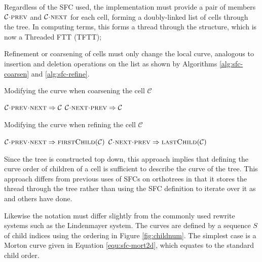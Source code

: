 \documentclass{IIBproject}
\newcommand{\acc}{{\mkern 0.5mu\cdot\mkern 0.5mu}}
\numberwithin{figure}{section}
\begin{document}
Regardless of the SFC used, the implementation must provide a pair of members $\mathcal{C}\acc\textproc{prev}$ and $\mathcal{C}\acc\textproc{next}$ for each cell, forming a doubly-linked list of cells through the tree. In computing terms, this forms a thread through the structure, which is now a Threaded FTT (TFTT);

Refinement or coarsening of cells must only change the local curve, analogous to insertion and deletion operations on the list as shown by Algorithms \ref{alg:sfc-coarsen} and \ref{alg:sfc-refine}.

\begin{algorithm}[H]
    \caption{Modifying the curve when coarsening the cell $\mathcal{C}$}
    \label{alg:sfc-coarsen}

    \begin{algorithmic}
        \State $\mathcal{C}\acc\textproc{prev}\acc\textproc{next} \Rightarrow \mathcal{C}$
        \State $\mathcal{C}\acc\textproc{next}\acc\textproc{prev} \Rightarrow \mathcal{C}$
    \end{algorithmic}
\end{algorithm}

\begin{algorithm}[H]
    \caption{Modifying the curve when refining the cell $\mathcal{C}$}
    \label{alg:sfc-refine}

    \begin{algorithmic}
        \Statex
        \State $\mathcal{C}\acc\textproc{prev}\acc\textproc{next} \Rightarrow \textproc{firstChild}(\mathcal{C})$
        \State $\mathcal{C}\acc\textproc{next}\acc\textproc{prev} \Rightarrow \textproc{lastChild}(\mathcal{C})$
    \end{algorithmic}
\end{algorithm}

Since the tree is constructed top down, this approach implies that defining the curve order of children of a cell is sufficient to describe the curve of the tree. This approach differs from previous uses of SFCs on orthotrees in that it stores the thread through the tree rather than using the SFC definition to iterate over it as \cite{bader2013} and others have done.

Likewise the notation must differ slightly from the commonly used rewrite systems such as the Lindenmayer system. The curves are defined by a sequence $S$ of child indices using the ordering in Figure \ref{fig:childnum}. The simplest case is a Morton curve given in Equation \ref{equ:sfc-mort2d}, which equates to the standard child order.
\end{document}
